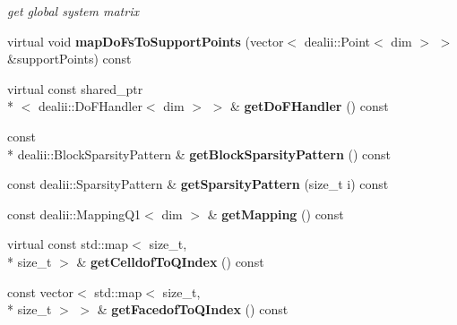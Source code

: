 \begin{DoxyCompactItemize}
\begin{DoxyCompactList}\small\item\em get global system matrix \end{DoxyCompactList}\item 
\hypertarget{classnatrium_1_1SEDGMinLee_ab01fe7f989aed26cb5547eaba8ddb4ee}{virtual void {\bfseries map\-Do\-Fs\-To\-Support\-Points} (vector$<$ dealii\-::\-Point$<$ dim $>$ $>$ \&support\-Points) const }\label{classnatrium_1_1SEDGMinLee_ab01fe7f989aed26cb5547eaba8ddb4ee}

\item 
\hypertarget{classnatrium_1_1SEDGMinLee_a3ffd3d7bc5aae9dbb5a021d7e4913f65}{virtual const shared\-\_\-ptr\\*
$<$ dealii\-::\-Do\-F\-Handler$<$ dim $>$ $>$ \& {\bfseries get\-Do\-F\-Handler} () const }\label{classnatrium_1_1SEDGMinLee_a3ffd3d7bc5aae9dbb5a021d7e4913f65}

\item 
\hypertarget{classnatrium_1_1SEDGMinLee_a10acabaac20a992130e88fb9bd395d31}{const \\*
dealii\-::\-Block\-Sparsity\-Pattern \& {\bfseries get\-Block\-Sparsity\-Pattern} () const }\label{classnatrium_1_1SEDGMinLee_a10acabaac20a992130e88fb9bd395d31}

\item 
\hypertarget{classnatrium_1_1SEDGMinLee_ac9392932aaab8186b427b9d12bc64771}{const dealii\-::\-Sparsity\-Pattern \& {\bfseries get\-Sparsity\-Pattern} (size\-\_\-t i) const }\label{classnatrium_1_1SEDGMinLee_ac9392932aaab8186b427b9d12bc64771}

\item 
\hypertarget{classnatrium_1_1SEDGMinLee_a7d093da19c6796a3021f5d3f4beab542}{const dealii\-::\-Mapping\-Q1$<$ dim $>$ \& {\bfseries get\-Mapping} () const }\label{classnatrium_1_1SEDGMinLee_a7d093da19c6796a3021f5d3f4beab542}

\item 
\hypertarget{classnatrium_1_1SEDGMinLee_aec38323cbd34487a73b4f62f0a310ceb}{virtual const std\-::map$<$ size\-\_\-t, \\*
size\-\_\-t $>$ \& {\bfseries get\-Celldof\-To\-Q\-Index} () const }\label{classnatrium_1_1SEDGMinLee_aec38323cbd34487a73b4f62f0a310ceb}

\item 
\hypertarget{classnatrium_1_1SEDGMinLee_a8b7d94c90ccfa5e341d854059d883f57}{const vector$<$ std\-::map$<$ size\-\_\-t, \\*
size\-\_\-t $>$ $>$ \& {\bfseries get\-Facedof\-To\-Q\-Index} () const }\label{classnatrium_1_1SEDGMinLee_a8b7d94c90ccfa5e341d854059d883f57}


\end{DoxyCompactItemize}
